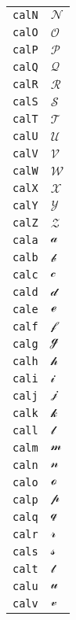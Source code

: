 \begin{longtable}{ll}
\texttt{calN}&${}{\mathcal{N}}{}$\\
\texttt{calO}&${}{\mathcal{O}}{}$\\
\texttt{calP}&${}{\mathcal{P}}{}$\\
\texttt{calQ}&${}{\mathcal{Q}}{}$\\
\texttt{calR}&${}{\mathcal{R}}{}$\\
\texttt{calS}&${}{\mathcal{S}}{}$\\
\texttt{calT}&${}{\mathcal{T}}{}$\\
\texttt{calU}&${}{\mathcal{U}}{}$\\
\texttt{calV}&${}{\mathcal{V}}{}$\\
\texttt{calW}&${}{\mathcal{W}}{}$\\
\texttt{calX}&${}{\mathcal{X}}{}$\\
\texttt{calY}&${}{\mathcal{Y}}{}$\\
\texttt{calZ}&${}{\mathcal{Z}}{}$\\
\texttt{cala}&${}{\mathcal{a}}{}$\\
\texttt{calb}&${}{\mathcal{b}}{}$\\
\texttt{calc}&${}{\mathcal{c}}{}$\\
\texttt{cald}&${}{\mathcal{d}}{}$\\
\texttt{cale}&${}{\mathcal{e}}{}$\\
\texttt{calf}&${}{\mathcal{f}}{}$\\
\texttt{calg}&${}{\mathcal{g}}{}$\\
\texttt{calh}&${}{\mathcal{h}}{}$\\
\texttt{cali}&${}{\mathcal{i}}{}$\\
\texttt{calj}&${}{\mathcal{j}}{}$\\
\texttt{calk}&${}{\mathcal{k}}{}$\\
\texttt{call}&${}{\mathcal{l}}{}$\\
\texttt{calm}&${}{\mathcal{m}}{}$\\
\texttt{caln}&${}{\mathcal{n}}{}$\\
\texttt{calo}&${}{\mathcal{o}}{}$\\
\texttt{calp}&${}{\mathcal{p}}{}$\\
\texttt{calq}&${}{\mathcal{q}}{}$\\
\texttt{calr}&${}{\mathcal{r}}{}$\\
\texttt{cals}&${}{\mathcal{s}}{}$\\
\texttt{calt}&${}{\mathcal{t}}{}$\\
\texttt{calu}&${}{\mathcal{u}}{}$\\
\texttt{calv}&${}{\mathcal{v}}{}$\\

\end{longtable}
